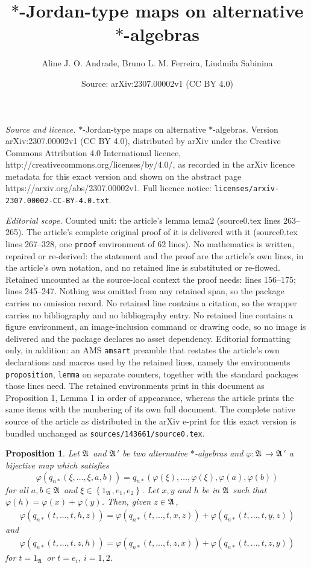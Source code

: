\documentclass[10pt,a4paper]{amsart}
\title{$*$-Jordan-type maps on alternative $*$-algebras}
\author{Aline J. O. Andrade, Bruno L. M. Ferreira, Liudmila Sabinina}
\date{Source: arXiv:2307.00002v1 (CC BY 4.0)}
\newtheorem{proposition}{Proposition}
\def\A{{\mathfrak A}\, }
\begin{document}
\maketitle

\noindent\emph{Source and licence.} $*$-Jordan-type maps on alternative $*$-algebras. Version arXiv:2307.00002v1 (CC BY 4.0), distributed by arXiv under the Creative Commons Attribution 4.0 International licence, http://creativecommons.org/licenses/by/4.0/, as recorded in the arXiv licence metadata for this exact version and shown on the abstract page https://arxiv.org/abs/2307.00002v1. Full licence notice: \texttt{licenses/arxiv-2307.00002-CC-BY-4.0.txt}.\par\smallskip

\noindent\textit{Editorial scope.} Counted unit: the article's lemma lema2 (source0.tex lines 263--265). The article's complete original proof of it is delivered with it (source0.tex lines 267--328, one \texttt{proof} environment of 62 lines). No mathematics is written, repaired or re-derived: the statement and the proof are the article's own lines, in the article's own notation, and no retained line is substituted or re-flowed.  Retained uncounted as the source-local context the proof needs: lines 156--175; lines 245--247.  Nothing was omitted from any retained span, so the package carries no omission record.  No retained line contains a citation, so the wrapper carries no bibliography and no bibliography entry.  No retained line contains a figure environment, an image-inclusion command or drawing code, so no image is delivered and the package declares no asset dependency.  Editorial formatting only, in addition: an AMS \texttt{amsart} preamble that restates the article's own declarations and macros used by the retained lines, namely the environments \texttt{proposition}, \texttt{lemma} on separate counters, together with the standard packages those lines need.  The retained environments print in this document as Proposition 1, Lemma 1 in order of appearance, whereas the article prints the same items with the numbering of its own full document.  The complete native source of the article as distributed in the arXiv e-print for this exact version is bundled unchanged as \texttt{sources/143661/source0.tex}.
\begin{proposition}\label{Claim2} Let $\A$ and $\A'$ be two alternative $*$-algebras and $\varphi: \A \rightarrow \A'$ a bijective map which satisfies
\[
\varphi(q_{n*}(\xi, \ldots,\xi, a,b)) = q_{n*}(\varphi(\xi),\ldots,\varphi(\xi),\varphi(a),\varphi(b))
\]
for all $a, b \in \A$ and $\xi \in \left\{1_{\A}, e_1, e_2\right\}$. Let $x,y$ and $h$ be in $\A$ such that $\varphi(h) = \varphi(x) + \varphi(y)$. Then,
 given $z \in \A$,
$$
\begin{aligned}
\varphi(q_{n*}(t,...,t,h,z)) = \varphi(q_{n*}(t,...,t,x,z)) + \varphi(q_{n*}(t,...,t,y,z))
\end{aligned}
$$
and
$$
\begin{aligned}
\varphi(q_{n*}(t,...,t,z,h)) = \varphi(q_{n*}(t,...,t,z,x)) + \varphi(q_{n*}(t,...,t,z,y))
\end{aligned}
$$
for $t = 1_\A$ or $t = e_i$, $i = 1,2$.

\end{proposition}
\end{document}
